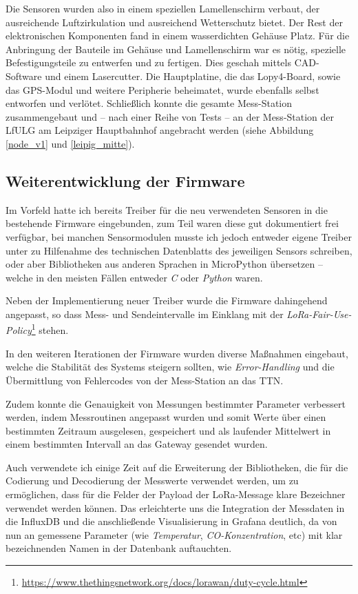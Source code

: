 \documentclass[a4paper,11pt]{article}
\begin{document}
Die Sensoren wurden also in einem speziellen Lamellenschirm verbaut, der
ausreichende Luftzirkulation und ausreichend Wetterschutz bietet. Der Rest der
elektronischen Komponenten fand in einem wasserdichten Gehäuse Platz. Für die
Anbringung der Bauteile im Gehäuse und Lamellenschirm war es nötig, spezielle
Befestigungsteile zu entwerfen und zu fertigen. Dies geschah mittels
CAD-Software und einem Lasercutter. Die Hauptplatine, die das Lopy4-Board,
sowie das GPS-Modul und weitere Peripherie beheimatet, wurde ebenfalls selbst
entworfen und verlötet. Schließlich konnte die gesamte Mess-Station
zusammengebaut und -- nach einer Reihe von Tests -- an der Mess-Station der
LfULG am Leipziger Hauptbahnhof angebracht werden (siehe Abbildung
\ref{node_v1} und \ref{leipig_mitte}).

\subsection{Weiterentwicklung der Firmware}

Im Vorfeld hatte ich bereits Treiber für die neu verwendeten Sensoren in die
bestehende Firmware eingebunden, zum Teil waren diese gut dokumentiert frei
verfügbar, bei manchen Sensormodulen musste ich jedoch entweder eigene Treiber
unter zu Hilfenahme des technischen Datenblatts des jeweiligen Sensors
schreiben, oder aber Bibliotheken aus anderen Sprachen in MicroPython
übersetzen -- welche in den meisten Fällen entweder \textit{C} oder
\textit{Python} waren.

Neben der Implementierung neuer Treiber wurde die Firmware dahingehend
angepasst, so dass Mess- und Sendeintervalle im Einklang mit der
\textit{LoRa-Fair-Use-Policy}\footnote{\url{https://www.thethingsnetwork.org/docs/lorawan/duty-cycle.html}}
stehen.

In den weiteren Iterationen der Firmware wurden diverse Maßnahmen eingebaut,
welche die Stabilität des Systems steigern sollten, wie
\textit{Error-Handling} und die Übermittlung von Fehlercodes von der
Mess-Station an das TTN.

Zudem konnte die Genauigkeit von Messungen bestimmter Parameter verbessert
werden, indem Messroutinen angepasst wurden und somit Werte über einen
bestimmten Zeitraum ausgelesen, gespeichert und als laufender Mittelwert in
einem bestimmten Intervall an das Gateway gesendet wurden.

Auch verwendete ich einige Zeit auf die Erweiterung der Bibliotheken, die für
die Codierung und Decodierung der Messwerte verwendet werden, um zu
ermöglichen, dass für die Felder der Payload der LoRa-Message klare Bezeichner
verwendet werden können. Das erleichterte uns die Integration der Messdaten in
die InfluxDB und die anschließende Visualisierung in Grafana deutlich, da von
nun an gemessene Parameter (wie \textit{Temperatur},
\textit{CO-Konzentration}, etc) mit klar bezeichnenden Namen in der Datenbank
auftauchten.
\end{document}
